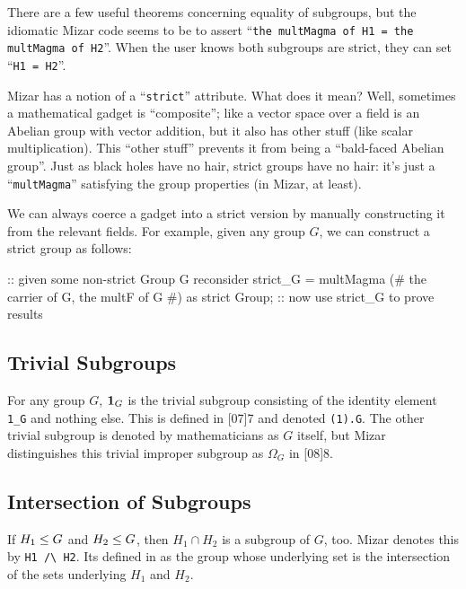There are a few useful theorems
concerning equality of subgroups, but the idiomatic Mizar code seems to
be to assert ``\lstinline{the multMagma of H1 = the multMagma of H2}''.
When the user knows both subgroups are strict, they can set ``\lstinline{H1 = H2}''.



\begin{aside}
Mizar has a notion of a ``\lstinline{strict}'' attribute. What does it mean?
Well, sometimes a mathematical gadget is ``composite''; like a vector
space over a field is an Abelian group with vector addition, but it also
has other stuff (like scalar multiplication). This ``other stuff''
prevents it from being a ``bald-faced Abelian group''. Just as black
holes have no hair, strict groups have no hair: it's just a
``\lstinline{multMagma}'' satisfying the group properties (in Mizar, at
least).

We can always coerce a gadget into a strict version by manually
constructing it from the relevant fields. For example, given any group
$G$, we can construct a strict group as follows:
\begin{mizar}
:: given some non-strict Group G
reconsider strict_G = multMagma (# the carrier of G, the multF of G #)
as strict Group;
:: now use strict_G to prove results
\end{mizar}
\end{aside}

\subsection{Trivial Subgroups}
For any group $G$, $\mathbf{1}_{G}$ is the trivial subgroup
consisting of the identity element \lstinline{1_G} and nothing else. This is
defined in [07]{7} and denoted \lstinline{(1).G}. The other
trivial subgroup is denoted by mathematicians as $G$ itself, but Mizar
distinguishes this trivial improper subgroup as $\Omega_{G}$ in
[08]{8}.

\subsection{Intersection of Subgroups}
If $H_{1}\leq G$ and $H_{2}\leq G$, then $H_{1}\cap H_{2}$ is
a subgroup of $G$, too. Mizar denotes this by
\lstinline{H1 /\ H2}. Its
defined in  as the group whose
underlying set is the intersection of the sets underlying $H_{1}$ and $H_{2}$.

